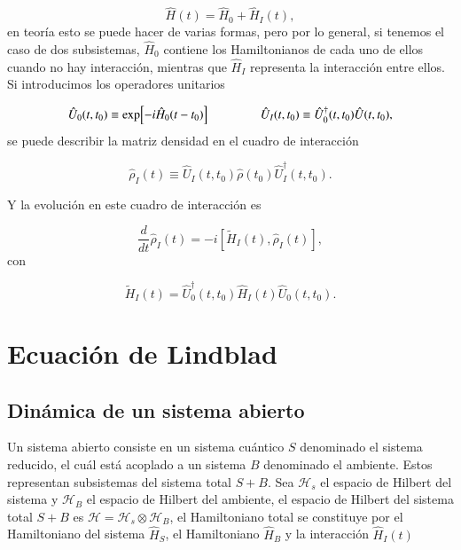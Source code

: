 \begin{equation*}
    \hat{H}(t) = \hat{H}_{0} + \hat{H}_{I}(t),
\end{equation*}
en teoría esto se puede hacer de varias formas, pero por lo general, si tenemos el caso de dos subsistemas, $\hat{H}_{0}$ contiene los Hamiltonianos de cada uno de ellos cuando no hay interacción, mientras que $\hat{H}_{I}$ representa la interacción entre ellos. Si introducimos los operadores unitarios

\begin{equation*}
    \hat{U}_{0}(t,t_{0}) \equiv \exp[-i\hat{H}_{0}(t-t_{0}) ]  \hspace{15mm} \hat{U}_{I}(t,t_0) \equiv \hat{U}^{\dagger}_{0}(t,t_{0})\hat{U}(t,t_{0}),
\end{equation*}
se puede describir la matriz densidad en el cuadro de interacción

\begin{equation*}
    \hat{\rho}_{I}(t) \equiv \hat{U}_{I}(t,t_{0})\hat{\rho}(t_{0})\hat{U}^{\dagger}_{I}(t,t_{0}).
\end{equation*}

Y la evolución en este cuadro de interacción es 

\begin{equation}
    \frac{d}{dt}\hat{\rho}_{I}(t) = -i[\tilde{H}_{I}(t), \hat{\rho}_{I}(t)],
    \label{sec11:interactionp}
\end{equation}
con 

\begin{equation*}
    \tilde{H}_{I}(t) = \hat{U}^{\dagger}_{0}(t,t_{0})\hat{H}_{I}(t)\hat{U}_{0}(t,t_{0}).
\end{equation*}

\label{sec:closedQM}



\section{Ecuación de Lindblad}
\label{SEClindblad}
\subsection{Dinámica de un sistema abierto}

Un sistema abierto consiste en un sistema cuántico $S$ denominado el sistema reducido, el cuál está acoplado a un sistema $B$ denominado el ambiente. Estos representan  subsistemas del sistema total $S+B$. Sea $\mathcal{H}_{s}$ el espacio de Hilbert del sistema y $\mathcal{H}_{B}$ el espacio de Hilbert del ambiente, el espacio de Hilbert del sistema total $S+B$ es  $\mathcal{H} = \mathcal{H}_{s} \otimes \mathcal{H}_{B}$, el Hamiltoniano total se constituye por el Hamiltoniano del sistema $\hat{H}_{S}$, el Hamiltoniano $\hat{H}_{B}$ y la interacción $\hat{H}_{I}(t)$

